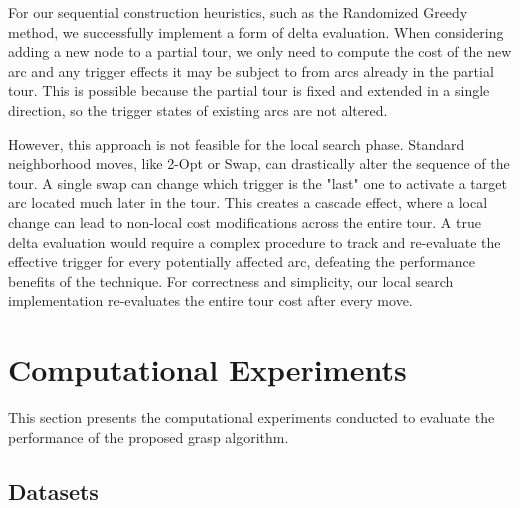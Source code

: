 \documentclass[twocolumn, switch]{article} %
\begin{document}
For our sequential construction heuristics, such as the Randomized Greedy method, we successfully implement a form of delta evaluation. When considering adding a new node to a partial tour, we only need to compute the cost of the new arc and any trigger effects it may be subject to from arcs already in the partial tour. This is possible because the partial tour is fixed and extended in a single direction, so the trigger states of existing arcs are not altered.

However, this approach is not feasible for the local search phase. Standard neighborhood moves, like 2-Opt or Swap, can drastically alter the sequence of the tour. A single swap can change which trigger is the "last" one to activate a target arc located much later in the tour. This creates a cascade effect, where a local change can lead to non-local cost modifications across the entire tour. A true delta evaluation would require a complex procedure to track and re-evaluate the effective trigger for every potentially affected arc, defeating the performance benefits of the technique. For correctness and simplicity, our local search implementation re-evaluates the entire tour cost after every move.

\section{Computational Experiments}
This section presents the computational experiments conducted to evaluate the performance of the proposed \gls{grasp} algorithm.

\subsection{Datasets}


\begin{table*}[!htpb]
    \centering
    \caption{Dataset Characteristics}
    \label{tab:dataset_characteristics}
\end{table*}
\end{document}
